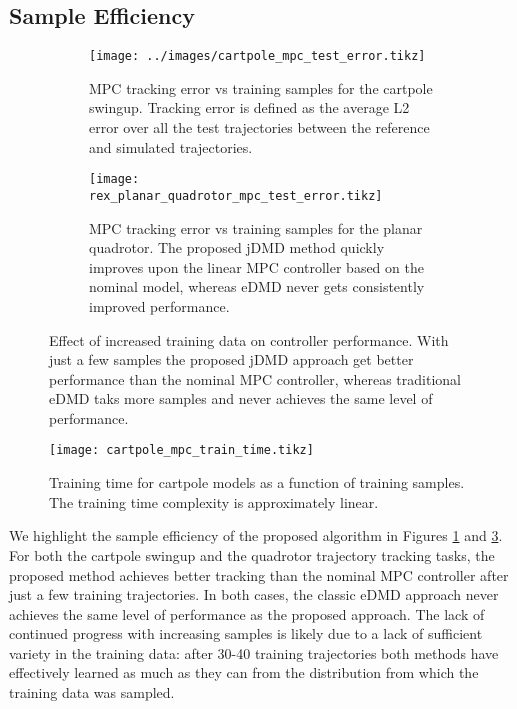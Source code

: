 \documentclass{article}
\begin{document}
\subsection{Sample Efficiency}
\begin{figure}[t]
  \centering
  \begin{subfigure}[t]{0.48\textwidth}
    \raggedleft
    \texttt{[image: ../images/cartpole\_mpc\_test\_error.tikz]}
    \caption{MPC tracking error vs training samples for the cartpole swingup. Tracking error
    is defined as the average L2 error over all the test trajectories between the reference
    and simulated trajectories.}
    \label{fig:cartpole_mpc_test_error}
  \end{subfigure}
  \hfill
  \begin{subfigure}[t]{0.48\textwidth}
    \raggedleft
    \texttt{[image: rex\_planar\_quadrotor\_mpc\_test\_error.tikz]}
    \caption{MPC tracking error vs training samples for the planar quadrotor. The proposed
    jDMD method quickly improves upon the linear MPC controller based on the nominal model,
    whereas eDMD never gets consistently improved performance.}
    \label{fig:rex_planar_quadrotor_mpc_test_error}
  \end{subfigure}
  \caption{Effect of increased training data on controller performance. With just a few 
  samples the proposed jDMD approach get better performance than the nominal 
  MPC controller, whereas traditional eDMD taks more samples and never achieves the same 
  level of performance.
  }
\end{figure}

\begin{figure}[t]
  \centering
  \texttt{[image: cartpole\_mpc\_train\_time.tikz]}
  \caption{Training time for cartpole models as a function of training samples. The 
  training time complexity is approximately linear.}
  \label{fig:cartpole_train_time}
\end{figure}



We highlight the sample efficiency of the proposed algorithm in Figures 
\ref{fig:cartpole_mpc_test_error} and \ref{fig:rex_planar_quadrotor_mpc_test_error}. For
both the cartpole swingup and the quadrotor trajectory tracking tasks, the proposed method
achieves better tracking than the nominal MPC controller after just a few training
trajectories. In both cases, the classic eDMD approach never achieves the same level of
performance as the proposed approach. The lack of continued progress with increasing samples
is likely due to a lack of sufficient variety in the training data: after 30-40 training
trajectories both methods have effectively learned as much as they can from the distribution
from which the training data was sampled.
\end{document}
